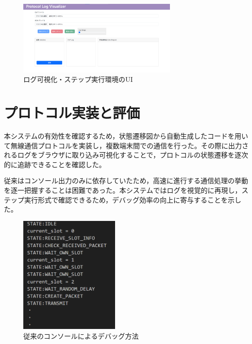 \documentclass[paper]{ieicej}
\begin{document}
  \begin{figure}[tb]
    \centering
    \includegraphics[width=80mm]{./images/viewer_ui.png}
    \caption{ログ可視化・ステップ実行環境のUI}
    \label{fig:viewer-ui}
  \end{figure}


\section{プロトコル実装と評価}
本システムの有効性を確認するため，状態遷移図から自動生成したコードを用いて無線通信プロトコルを実装し，複数端末間での通信を行った。その際に出力されるログをブラウザに取り込み可視化することで，プロトコルの状態遷移を逐次的に追跡できることを確認した。

従来はコンソール出力のみに依存していたため，高速に進行する通信処理の挙動を逐一把握することは困難であった。本システムではログを視覚的に再現し，ステップ実行形式で確認できるため，デバッグ効率の向上に寄与することを示した。
\begin{figure}[tb]
  \centering
  \includegraphics[width=50mm]{./images/old_debug.png}
  \caption{従来のコンソールによるデバッグ方法}
  \label{fig:old-debug}
\end{figure}


\end{document}
